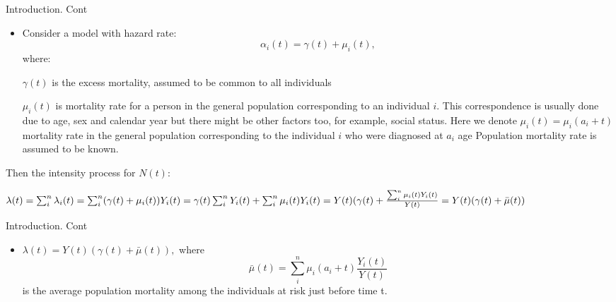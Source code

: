 \documentclass{beamer}
\begin{document}
 \begin{frame}{Introduction. Cont}
 \begin{itemize}
    \item Consider a model with hazard rate:
    \begin{equation}
    \label{eq0}
       \alpha_i(t) = \gamma(t) + \mu_i(t),
    \end{equation} where:


     
     $\gamma(t)$ is the excess mortality, assumed to be common to all individuals%
     
     
     $\mu_i(t)$ is mortality rate for a person in the general population corresponding to an individual $i$. This correspondence is usually done due to age, sex and calendar year but there might be other factors too, for example, social status.
     \newline
     Here we denote $\mu_i(t) = \mu_i(a_i + t)$ mortality rate in the general population corresponding to the individual $i$ who were diagnosed at $a_i$ age
     \newline
     Population mortality rate is assumed to be known. 
 \end{itemize}
 \end{frame}
 
 \begin{frame}
Then the intensity process for $N(t)$:
\newline

 $\lambda(t) = \sum_i^n \lambda_i(t) = \sum_i^n (\gamma(t) + \mu_i(t)) Y_i(t) \\= \gamma(t)\sum_i^n Y_i(t) + \sum_i^n \mu_i(t) Y_i(t) = Y(t) (\gamma(t) + \frac{\sum_i^n \mu_i(t) Y_i(t)}{Y(t)} \\
     = Y(t) (\gamma(t) + \bar\mu(t))$
 
  \end{frame}
  
  \begin{frame}{Introduction. Cont}
  \begin{itemize}
      \item $\lambda(t) = Y(t) (\gamma(t) + \bar\mu(t)),$ 
      where 
     \begin{equation}
     \label{eq1}
     \bar\mu(t) = \sum_i^n \mu_i(a_i+t) \frac{Y_i(t)}{Y(t)}
     \end{equation}
   \newline
     is the average population mortality among the individuals at risk just before time t.
   \end{itemize}
\end{frame}
\end{document}
